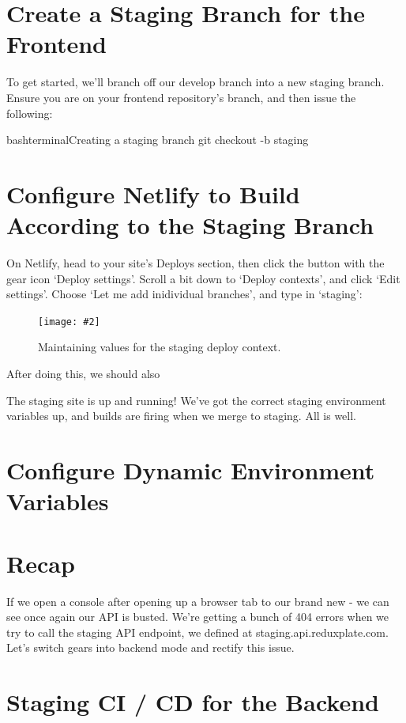 \documentclass[a4paper,headinclude=on,footinclude=on,12pt,oneside]{scrbook}
\newcommand{\standardfigure}[3]{\begin{figure}[H]\begin{center}\texttt{[image: \#2]}\caption{#3}\label{fig:#2}\end{center}\end{figure}}
\begin{document}
\section{Create a Staging Branch for the Frontend}

To get started, we'll branch off our develop branch into a new staging branch. Ensure you are on your frontend repository's  branch, and then issue the following:

\begin{codeInput}{bash}{terminal}{Creating a staging branch}
git checkout -b staging
\end{codeInput}

\section{Configure Netlify to Build According to the Staging Branch}

On Netlify, head to your site's Deploys section, then click the button with the gear icon `Deploy settings'. Scroll a bit down to `Deploy contexts', and click `Edit settings'. Choose `Let me add inidividual branches', and type in `staging':

\standardfigure{\textwidth}{frontend/netlify/staging-deploy-context}{Maintaining values for the staging deploy context.}

After doing this, we should also 

The staging site is up and running! We've got the correct staging environment variables up, and builds are firing when we merge to staging. All is well. 

\section{Configure Dynamic Environment Variables}

\section{Recap}

If we open a console after opening up a browser tab to our brand new  - we can see once again our API is busted. We're getting a bunch of 404 errors when we try to call the staging API endpoint,  we defined at staging.api.reduxplate.com. Let's switch gears into backend mode and rectify this issue.

\section{Staging CI / CD for the Backend}
\end{document}
